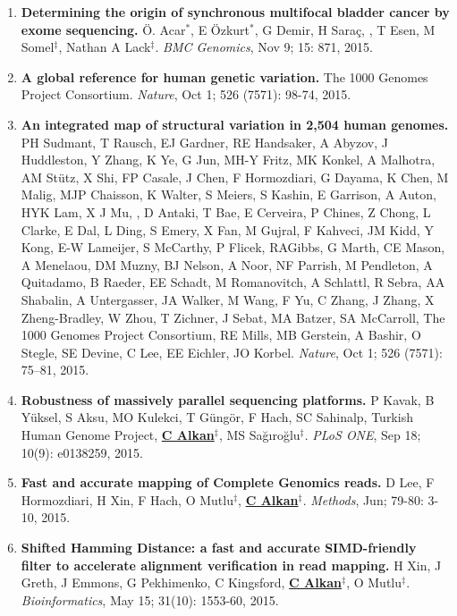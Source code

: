 \begin{enumerate}
  \item        
  {\bf Determining the origin of synchronous multifocal bladder cancer by exome sequencing.} 
  Ö. Acar$^*$, E Özkurt$^*$, G Demir, H Saraç, \calkan{}, T Esen, M Somel$^\ddag$, Nathan A Lack$^\ddag$.
 {\em BMC Genomics}, Nov 9;  15: 871, 2015.

  \item        
  {\bf A global reference for human genetic variation.} The 1000 Genomes Project Consortium.  {\em Nature}, Oct 1;  526 (7571): 98-74, 2015.


  \item        
  {\bf An integrated map of structural variation in 2,504 human genomes.}
  PH Sudmant, T Rausch, EJ Gardner,  RE Handsaker, A Abyzov, J Huddleston, Y Zhang, K Ye, G Jun, MH-Y Fritz, MK Konkel, A Malhotra, AM Stütz, X Shi, FP Casale, J Chen, 
  F Hormozdiari, G Dayama, K Chen, M Malig, MJP Chaisson, K Walter, S Meiers, S Kashin, E Garrison, A Auton, HYK Lam, X J Mu, \calkan, D Antaki, T Bae, E Cerveira, P Chines, Z Chong, 
  L Clarke, E Dal, L Ding, S Emery, X Fan, M Gujral, F Kahveci, JM Kidd, Y Kong, E-W Lameijer, S McCarthy, P Flicek, RAGibbs, G Marth, CE Mason, A Menelaou, DM Muzny, 
  BJ Nelson, A Noor, NF Parrish, M Pendleton, A Quitadamo, B Raeder, EE Schadt, M Romanovitch, A Schlattl, R Sebra, AA Shabalin, A Untergasser, 
  JA Walker, M Wang, F Yu, C Zhang, J Zhang, X Zheng-Bradley, W Zhou, T Zichner, J Sebat, MA Batzer, SA McCarroll, 
  The 1000 Genomes Project Consortium, RE Mills, MB Gerstein, A Bashir, O Stegle, SE Devine, C Lee, EE Eichler, JO Korbel. 
  {\em Nature}, Oct 1;  526 (7571): 75–81, 2015.

  \item        
  {\bf Robustness of massively parallel sequencing platforms.}
  P Kavak, B Yüksel, S Aksu, MO Kulekci, T Güngör, F Hach, SC Sahinalp, Turkish Human Genome Project, {\bf {\underline {C Alkan}}}$^\ddag$,
  MS Sağıroğlu$^\ddag$.    
  {\em PLoS ONE},  Sep 18; 10(9): e0138259, 2015.  

  \item        
  {\bf Fast and accurate mapping of Complete Genomics reads.}
  D Lee, F Hormozdiari, H Xin, F Hach, O Mutlu$^\ddag$,  {\bf {\underline {C Alkan}}}$^\ddag$.
  {\em Methods}, Jun; 79-80: 3-10, 2015. 

  \item        
  {\bf Shifted Hamming Distance: a fast and accurate SIMD-friendly filter to accelerate alignment verification in read mapping.} H Xin, J Greth, J Emmons, 
G Pekhimenko, C Kingsford, {\bf {\underline{C Alkan}}}$^\ddag$,  O Mutlu$^\ddag$. {\em Bioinformatics},  May 15; 31(10): 1553-60, 2015.




\end{enumerate}
